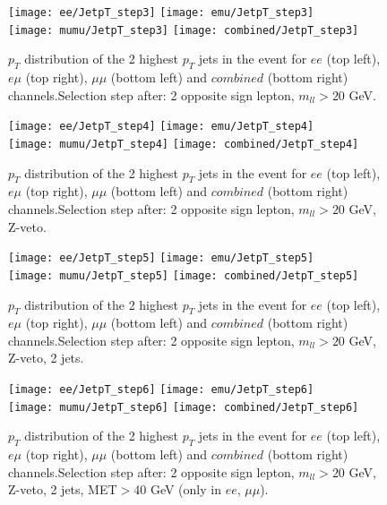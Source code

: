 \clearpage
\newpage

\begin{figure}
  \texttt{[image: ee/JetpT\_step3]}
  \texttt{[image: emu/JetpT\_step3]}\\
  \texttt{[image: mumu/JetpT\_step3]}
  \texttt{[image: combined/JetpT\_step3]}
\caption{$p_T$ distribution of the 2 highest $p_T$ jets in the event for $ee$ (top left), $e\mu$ (top right), $\mu\mu$ (bottom left) and $combined$ (bottom right) channels.\newline Selection step after: 2 opposite sign lepton, $m_{ll}>20$ GeV.}
\end{figure}

\clearpage
\newpage


\begin{figure}
  \texttt{[image: ee/JetpT\_step4]}
  \texttt{[image: emu/JetpT\_step4]}\\
  \texttt{[image: mumu/JetpT\_step4]}
  \texttt{[image: combined/JetpT\_step4]}
\caption{$p_T$ distribution of the 2 highest $p_T$ jets in the event for $ee$ (top left), $e\mu$ (top right), $\mu\mu$ (bottom left) and $combined$ (bottom right) channels.\newline Selection step after: 2 opposite sign lepton, $m_{ll}>20$ GeV, Z-veto.}
\end{figure}

\clearpage
\newpage


\begin{figure}
  \texttt{[image: ee/JetpT\_step5]}
  \texttt{[image: emu/JetpT\_step5]}\\
  \texttt{[image: mumu/JetpT\_step5]}
  \texttt{[image: combined/JetpT\_step5]}
\caption{$p_T$ distribution of the 2 highest $p_T$ jets in the event for $ee$ (top left), $e\mu$ (top right), $\mu\mu$ (bottom left) and $combined$ (bottom right) channels.\newline Selection step after: 2 opposite sign lepton, $m_{ll}>20$ GeV, Z-veto, 2 jets.}
\end{figure}

\clearpage
\newpage


\begin{figure}
  \texttt{[image: ee/JetpT\_step6]}
  \texttt{[image: emu/JetpT\_step6]}\\
  \texttt{[image: mumu/JetpT\_step6]}
  \texttt{[image: combined/JetpT\_step6]}
\caption{$p_T$ distribution of the 2 highest $p_T$ jets in the event for $ee$ (top left), $e\mu$ (top right), $\mu\mu$ (bottom left) and $combined$ (bottom right) channels.\newline Selection step after: 2 opposite sign lepton, $m_{ll}>20$ GeV, Z-veto, 2 jets, MET$>40$ GeV (only in $ee$, $\mu\mu$).}
\end{figure}

